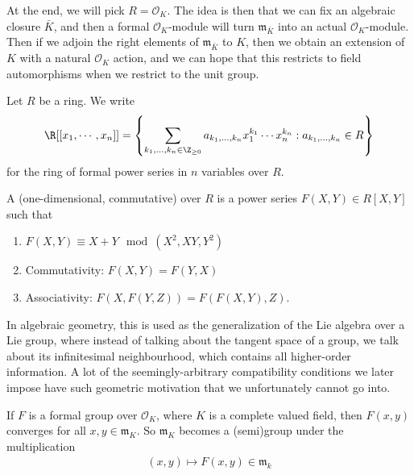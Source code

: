 \documentclass[a4paper]{article}
\begin{document}
At the end, we will pick $R = \mathcal{O}_K$. The idea is then that we can fix an algebraic closure $\bar{K}$, and then a formal $\mathcal{O}_K$-module will turn $\mathfrak{m}_{\bar{K}}$ into an actual $\mathcal{O}_K$-module. Then if we adjoin the right elements of $\mathfrak{m}_{\bar{K}}$ to $K$, then we obtain an extension of $K$ with a natural $\mathcal{O}_K$ action, and we can hope that this restricts to field automorphisms when we restrict to the unit group.


\begin{notation}
  Let $R$ be a ring. We write
  \[
    \R[[x_1, \cdots, x_n]] = \left\{ \sum_{k_1, \ldots, k_n \in \Z_{\geq 0}} a_{k_1, \ldots, k_n} x_1^{k_1} \cdots x_n^{k_n}: a_{k_1, \ldots, k_n} \in R\right\}
  \]
  for the ring of formal power series in $n$ variables over $R$.
\end{notation}

\begin{defi}
  A (one-dimensional, commutative)  over $R$ is a power series $F(X, Y) \in R[X, Y]$ such that
  \begin{enumerate}
    \item $F(X, Y) \equiv X + Y \mod (X^2, XY, Y^2)$
    \item Commutativity: $F(X, Y) = F(Y, X)$
    \item Associativity: $F(X, F(Y, Z)) = F(F(X, Y), Z)$.
  \end{enumerate}
\end{defi}
In algebraic geometry, this is used as the generalization of the Lie algebra over a Lie group, where instead of talking about the tangent space of a group, we talk about its infinitesimal neighbourhood, which contains all higher-order information. A lot of the seemingly-arbitrary compatibility conditions we later impose have such geometric motivation that we unfortunately cannot go into.

\begin{eg}
  If $F$ is a formal group over $\mathcal{O}_K$, where $K$ is a complete valued field, then $F(x, y)$ converges for all $x, y \in \mathfrak{m}_K$. So $\mathfrak{m}_K$ becomes a (semi)group under the multiplication
  \begin{align*}
    (x, y) \mapsto F(x, y) \in \mathfrak{m}_k
  \end{align*}
\end{eg}
\end{document}
